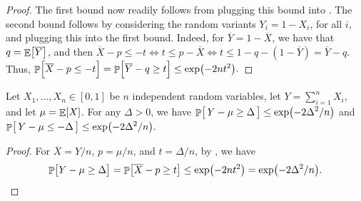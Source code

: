 \begin{proof}
    The first bound now readily follows from plugging this bound into
    . The second bound follows by considering the
    random variants $Y_i =1-X_i$, for all $i$, and plugging this into the
    first bound. Indeed, for $\overline{Y} = 1-\overline{X}$, we have
    that $q = \mathop{\mathbb{E}}\!\left[ {\overline{Y}} \right]$, and then
    \begin{math}
        \overline{X} - p \leq -t%
        \iff%
        t \leq p - \overline{X}%
        \iff%
        t \leq 1-q - (1- \overline{Y}) = \overline{Y} - q.
    \end{math}
    Thus,
    \begin{math}%
        \ds%
        \Prob{\Bigl.\overline{X} - p \leq -t }%
        = \Prob{\Bigl.\overline{Y} - q \geq t }%
        \leq%
        \exp\pth{ -2 n t^2}.
    \end{math}
\end{proof}

\begin{corollary}
    Let $X_1, \ldots, X_n \in [0,1]$ be $n$ independent random
    variables, let $Y = \sum_{i=1}^n X_i$, and let $\mu = \mathop{\mathbb{E}}\!\left[ {X} \right]$. For
    any $\Delta > 0$, we have
    \begin{math}%
        \ds%
        \Prob{\bigl.\,Y - \mu \geq \Delta\, }%
        \leq%
        \exp\pth{ -2 \Delta^2/n}
    \end{math}
    and
    \begin{math}%
        \ds%
        \Prob{\bigl.\, Y - \mu \leq -\Delta \, }%
        \leq%
        \exp\pth{ -2 \Delta^2/n}.
    \end{math}
\end{corollary}

\begin{proof}
    For $\overline{X} = Y/n$, $p =\mu /n $, and $t = \Delta/n$, by
    , we have
    \begin{equation*}
        \Prob{\bigl.Y - \mu \geq \Delta }%
        =%
        \Prob{\bigl. \smash{\overline{X}} - p \geq t }%
        \ds%
        \leq%
        \exp\pth{ -2 nt^2 }
        =%
        \exp\pth{ -2 \Delta^2 /n  }.
    \end{equation*}
\end{proof}


